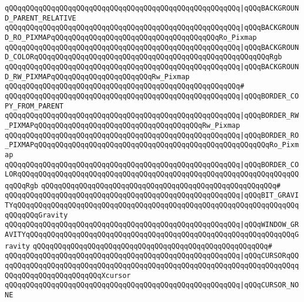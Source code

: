 \verb|qQQqqQQqqQQqqQQqqQQqqQQqqQQqqQQqqQQqqQQqqQQqqQQqqQQqqQQq|\verb#|qQQqBACKGROUND_PARENT_RELATIVE#\newline
\verb|qQQqqQQqqQQqqQQqqQQqqQQqqQQqqQQqqQQqqQQqqQQqqQQqqQQqqQQq|\verb#|qQQqBACKGROUND_RO_PIXMAPqQQqqQQqqQQqqQQqqQQqqQQqqQQqqQQqqQQqqQQqRo_Pixmap#\newline
\verb|qQQqqQQqqQQqqQQqqQQqqQQqqQQqqQQqqQQqqQQqqQQqqQQqqQQqqQQq|\verb#|qQQqBACKGROUND_COLORqQQqqQQqqQQqqQQqqQQqqQQqqQQqqQQqqQQqqQQqqQQqqQQqqQQqqQQqRgb#\newline
\verb|qQQqqQQqqQQqqQQqqQQqqQQqqQQqqQQqqQQqqQQqqQQqqQQqqQQqqQQq|\verb#|qQQqBACKGROUND_RW_PIXMAPqQQqqQQqqQQqqQQqqQQqqQQqRw_Pixmap#\newline
\verb|qQQqqQQqqQQqqQQqqQQqqQQqqQQqqQQqqQQqqQQqqQQqqQQqqQQqqQQq#|\newline
\verb|qQQqqQQqqQQqqQQqqQQqqQQqqQQqqQQqqQQqqQQqqQQqqQQqqQQqqQQq|\verb#|qQQqBORDER_COPY_FROM_PARENT#\newline
\verb|qQQqqQQqqQQqqQQqqQQqqQQqqQQqqQQqqQQqqQQqqQQqqQQqqQQqqQQq|\verb#|qQQqBORDER_RW_PIXMAPqQQqqQQqqQQqqQQqqQQqqQQqqQQqqQQqqQQqqQQqRw_Pixmap#\newline
\verb|qQQqqQQqqQQqqQQqqQQqqQQqqQQqqQQqqQQqqQQqqQQqqQQqqQQqqQQq|\verb#|qQQqBORDER_RO_PIXMAPqQQqqQQqqQQqqQQqqQQqqQQqqQQqqQQqqQQqqQQqqQQqqQQqqQQqqQQqRo_Pixmap#\newline
\verb|qQQqqQQqqQQqqQQqqQQqqQQqqQQqqQQqqQQqqQQqqQQqqQQqqQQqqQQq|\verb#|qQQqBORDER_COLORqQQqqQQqqQQqqQQqqQQqqQQqqQQqqQQqqQQqqQQqqQQqqQQqqQQqqQQqqQQqqQQqqQQqqQQqRgb#\newline
\verb|qQQqqQQqqQQqqQQqqQQqqQQqqQQqqQQqqQQqqQQqqQQqqQQqqQQqqQQq#|\newline
\verb|qQQqqQQqqQQqqQQqqQQqqQQqqQQqqQQqqQQqqQQqqQQqqQQqqQQqqQQq|\verb#|qQQqBIT_GRAVITYqQQqqQQqqQQqqQQqqQQqqQQqqQQqqQQqqQQqqQQqqQQqqQQqqQQqqQQqqQQqqQQqqQQqqQQqqQQqGravity#\newline
\verb|qQQqqQQqqQQqqQQqqQQqqQQqqQQqqQQqqQQqqQQqqQQqqQQqqQQqqQQq|\verb#|qQQqWINDOW_GRAVITYqQQqqQQqqQQqqQQqqQQqqQQqqQQqqQQqqQQqqQQqqQQqqQQqqQQqqQQqqQQqqQQqGravity#\newline
\verb|qQQqqQQqqQQqqQQqqQQqqQQqqQQqqQQqqQQqqQQqqQQqqQQqqQQqqQQq#|\newline
\verb|qQQqqQQqqQQqqQQqqQQqqQQqqQQqqQQqqQQqqQQqqQQqqQQqqQQqqQQq|\verb#|qQQqCURSORqQQqqQQqqQQqqQQqqQQqqQQqqQQqqQQqqQQqqQQqqQQqqQQqqQQqqQQqqQQqqQQqqQQqqQQqqQQqqQQqqQQqqQQqqQQqqQQqXcursor#\newline
\verb|qQQqqQQqqQQqqQQqqQQqqQQqqQQqqQQqqQQqqQQqqQQqqQQqqQQqqQQq|\verb#|qQQqCURSOR_NONE#\newline
